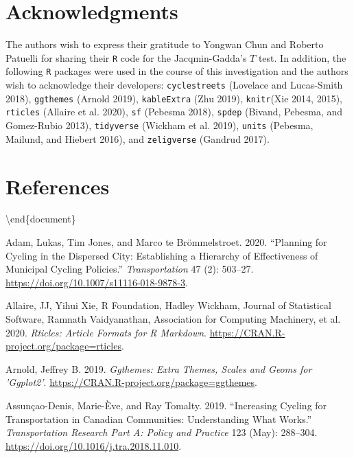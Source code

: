 \documentclass[smallextended]{svjour3}       %
\begin{document}
\hypertarget{sec:acknowledgments}{%
\section{Acknowledgments}\label{sec:acknowledgments}}

The authors wish to express their gratitude to Yongwan Chun and Roberto
Patuelli for sharing their \texttt{R} code for the Jacqmin-Gadda's \(T\)
test. In addition, the following \texttt{R} packages were used in the
course of this investigation and the authors wish to acknowledge their
developers: \texttt{cyclestreets} (Lovelace and Lucas-Smith 2018),
\texttt{ggthemes} (Arnold 2019), \texttt{kableExtra} (Zhu 2019),
\texttt{knitr}(Xie 2014, 2015), \texttt{rticles} (Allaire et al. 2020),
\texttt{sf} (Pebesma 2018), \texttt{spdep} (Bivand, Pebesma, and
Gomez-Rubio 2013), \texttt{tidyverse} (Wickham et al. 2019),
\texttt{units} (Pebesma, Mailund, and Hiebert 2016), and
\texttt{zeligverse} (Gandrud 2017).

\hypertarget{references}{%
\section*{References}\label{references}}

\textbackslash end\{document\}

\hypertarget{refs}{}
\leavevmode\hypertarget{ref-Adam2020}{}%
Adam, Lukas, Tim Jones, and Marco te Brömmelstroet. 2020. ``Planning for
Cycling in the Dispersed City: Establishing a Hierarchy of Effectiveness
of Municipal Cycling Policies.'' \emph{Transportation} 47 (2): 503--27.
\url{https://doi.org/10.1007/s11116-018-9878-3}.

\leavevmode\hypertarget{ref-Allaire2020}{}%
Allaire, JJ, Yihui Xie, R Foundation, Hadley Wickham, Journal of
Statistical Software, Ramnath Vaidyanathan, Association for Computing
Machinery, et al. 2020. \emph{Rticles: Article Formats for R Markdown}.
\url{https://CRAN.R-project.org/package=rticles}.

\leavevmode\hypertarget{ref-Arnold2019}{}%
Arnold, Jeffrey B. 2019. \emph{Ggthemes: Extra Themes, Scales and Geoms
for 'Ggplot2'}. \url{https://CRAN.R-project.org/package=ggthemes}.

\leavevmode\hypertarget{ref-Assuncao2019}{}%
Assunçao-Denis, Marie-Ève, and Ray Tomalty. 2019. ``Increasing Cycling
for Transportation in Canadian Communities: Understanding What Works.''
\emph{Transportation Research Part A: Policy and Practice} 123 (May):
288--304. \url{https://doi.org/10.1016/j.tra.2018.11.010}.
\end{document}
